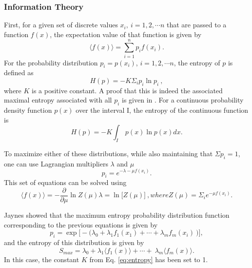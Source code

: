 \subsubsection*{Information Theory}

First, for a given set of discrete values $x_i, \: i=1,2, \cdots n$
that are passed to a function $f(x)$, the expectation value of that function is given
by
\begin{equation}
  \big\langle f(x) \big\rangle = \sum_{i=1}^n p_if(x_i).
\end{equation}
For the probability distribution $p_i = p(x_i)$, $i=1,2, \cdots n$, the entropy of
$p$ is defined as
\begin{equation}
  H(p) = - K \Sigma_i p_i \ln p_i \:,
  \label{eq:entropy}
\end{equation}
where $K$ is a positive constant. A proof that this is indeed the associated
maximal entropy associated with all $p_i$ is given in
\cite{jaynes_information_1957}.
For a continuous probability density function $p(x)$ over the interval I, the
entropy of the continuous function is
\begin{equation}
  H(p) = - K \int_I\ p(x) \ln p(x) dx .
\end{equation}

To maximize either of these distributions, while also maintaining that $\Sigma
p_i = 1$, one can use Lagrangian multipliers $\lambda$ and $\mu$
\begin{equation}
  p_i = e^{-\lambda-\mu f(x_i)} .
\end{equation}
This set of equations can be solved using
\begin{subequations}
  \begin{equation}
    \big\langle f(x) \big\rangle = - \frac{\partial}{\partial \mu} \ln Z(\mu)
  \end{equation}
  \begin{equation}
    \lambda = \ln\big[Z(\mu)\big]\:,
  \end{equation}
  where
  \begin{equation}
    Z(\mu) = \Sigma_i e^{-\mu f(x_i)} .
  \end{equation}
\end{subequations}

Jaynes \cite{jaynes_information_1957, jaynes_information_1957-1}
showed that the maximum
entropy probability distribution function corresponding to the previous
equations is given by
\begin{equation}
  p_i= \exp \big[ - \big( \lambda_0 + \lambda_1f_1(x_1) + \cdots + \lambda_m f_m(x_i) \
    \big) \big] ,
\end{equation}
and the entropy of this distribution is given by
\begin{equation}
  S_{max} = \lambda_0 + \lambda_1 \big\langle f_1 (x) \big\rangle + \cdots + \
  \lambda_m \big\langle f_m(x) \big\rangle .
\end{equation}
In this case, the constant $K$ from Eq. \eqref{eq:entropy} has been set to 1.

